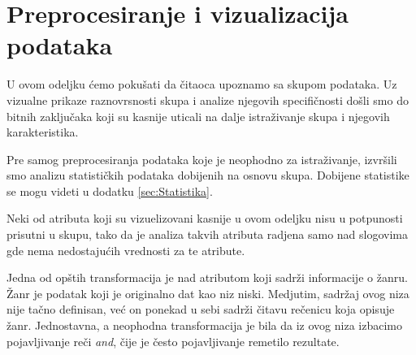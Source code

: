 \section{Preprocesiranje i vizualizacija podataka}
\label{sec:Preprocesiranje}

U ovom odeljku \'c{}emo poku\v{s}ati da \v{c}itaoca upoznamo sa skupom podataka. Uz vizualne prikaze raznovrsnosti skupa i analize njegovih specifi\v{c}nosti do\v{s}li smo do bitnih zaklju\v{c}aka koji su kasnije uticali na dalje istra\v{z}ivanje skupa i njegovih karakteristika.

Pre samog preprocesiranja podataka koje je neophodno za istra\v{z}ivanje, izvr\v{s}ili smo analizu statisti\v{c}kih podataka dobijenih na osnovu skupa. Dobijene statistike se mogu videti u dodatku \ref{sec:Statistika}.

Neki od atributa koji su vizuelizovani kasnije u ovom odeljku nisu u potpunosti prisutni u skupu, tako da je analiza takvih atributa radjena samo nad slogovima gde nema nedostaju\'c{}ih vrednosti za te atribute.

Jedna od op\v{s}tih transformacija je nad atributom koji sadr\v{z}i informacije o \v{z}anru. \v{Z}anr je podatak koji je originalno dat kao niz niski. Medjutim, sadr\v{z}aj ovog niza nije ta\v{c}no definisan, ve\'c{} on ponekad u sebi sadr\v{z}i \v{c}itavu re\v{c}enicu koja opisuje \v{z}anr. Jednostavna, a neophodna transformacija je bila da iz ovog niza izbacimo pojavljivanje re\v{c}i \emph{and}, \v{c}ije je \v{c}esto pojavljivanje remetilo rezultate.

